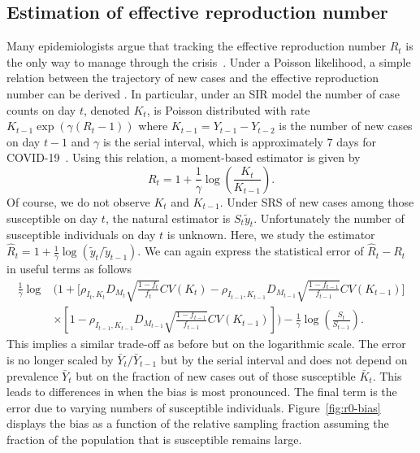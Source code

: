\documentclass[11pt]{amsart}
\begin{document}
\subsection{Estimation of effective reproduction number}
\label{section:r0-estimation}
Many epidemiologists argue that tracking the effective reproduction number $R_t$ is the only way to manage through the crisis~\citep{Gabriel2020}.  Under a Poisson likelihood, a simple relation between the trajectory of new cases and the effective reproduction number can be derived \citep{Bettencourt2008}.  In particular, under an SIR model the number of case counts on day $t$, denoted $K_t$, is Poisson distributed with rate $K_{t-1} \exp \left( \gamma (R_t - 1) \right)$ where $K_{t-1} = Y_{t-1}-Y_{t-2}$ is the number of new cases on day $t-1$ and $\gamma$ is the serial interval, which is approximately $7$ days for COVID-19~\citep{Sanche2020}.  Using this relation, a moment-based estimator is given by
$$
R_t = 1 + \frac{1}{\gamma} \log \left( \frac{K_t}{K_{t-1}} \right).
$$
Of course, we do not observe $K_t$ and $K_{t-1}$.  Under SRS of new cases among those susceptible on day $t$, the natural estimator is $S_t \tilde y_t$.  Unfortunately the number of susceptible individuals on day $t$ is unknown.  Here, we study the estimator $\hat R_t = 1 + \frac{1}{\gamma} \log \left( \tilde y_t / \tilde y_{t-1} \right)$. We can again express the statistical error of $\hat R_t - R_t$ in useful terms as follows
$$
\begin{aligned}
\frac{1}{\gamma}\log &\bigg( 1 + \bigg[ \rho_{I_t,K_t} D_{M_t} \sqrt{\frac{1-f_t}{f_t}} CV (K_t)  -\rho_{I_{t-1},K_{t-1}} D_{M_{t-1}} \sqrt{\frac{1-f_{t-1}}{f_{t-1}}} CV (K_{t-1}) \bigg] \\
&\times \left[ 1 - \rho_{I_{t-1},K_{t-1}} D_{M_{t-1}} \sqrt{\frac{1-f_{t-1}}{f_{t-1}}} CV (K_{t-1}) \right] \bigg) - \frac{1}{\gamma} \log \left( \frac{S_t}{S_{t-1}} \right).
\end{aligned}
$$
This implies a similar trade-off as before but on the logarithmic scale.  The error is no longer scaled by $\bar Y_t/\bar Y_{t-1}$ but by the serial interval and does not depend on prevalence $\bar Y_t$ but on the fraction of new cases out of those susceptible $\bar K_t$. This leads to differences in when the bias is most pronounced. The final term is the error due to varying numbers of susceptible individuals.  Figure~\ref{fig:r0-bias} displays the bias as a function of the relative sampling fraction assuming the fraction of the population that is susceptible remains large.
\end{document}

